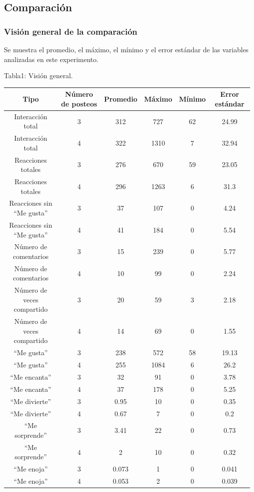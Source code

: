 \documentclass[a4paper,10pt]{article}
\begin{document}
\subsection{Comparación}
\subsubsection{Visión general de la comparación}
Se muestra el promedio, el máximo, el mínimo y el error estándar de las 
variables analizadas en este experimento.
\begin{center}
 \caption{Tabla1: Visión general.}
 {\footnotesize
  \begin{tabular} {c|c|c|c|c|c}
   \hline
   Tipo & Número de posteos & Promedio & Máximo & Mínimo & Error estándar \\
   \hline
   Interacción total  & 3  & 312 & 727  & 62 & 24.99 \\
   Interacción total  & 4  & 322 & 1310 & 7  & 32.94 \\
   Reacciones totales & 3  & 276 & 670  & 59 & 23.05 \\
   Reacciones totales & 4  & 296 & 1263 & 6  & 31.3 \\
   Reacciones sin ``Me gusta'' & 3  & 37 & 107 & 0 & 4.24 \\
   Reacciones sin ``Me gusta'' & 4  & 41 & 184 & 0 & 5.54 \\
   Número de comentarios & 3  & 15 & 239 & 0 & 5.77 \\
   Número de comentarios & 4  & 10 & 99  & 0 & 2.24 \\
   Número de veces compartido & 3  & 20 & 59 & 3 & 2.18 \\
   Número de veces compartido & 4  & 14 & 69 & 0 & 1.55 \\
   ``Me gusta'' & 3  & 238 & 572 & 58 & 19.13 \\
   ``Me gusta'' & 4  & 255 & 1084 & 6 & 26.2 \\
   ``Me encanta'' & 3  & 32 & 91 & 0 & 3.78 \\
   ``Me encanta'' & 4  & 37 & 178 & 0 & 5.25 \\
   ``Me divierte'' & 3  & 0.95 & 10 & 0 & 0.35 \\
   ``Me divierte'' & 4  & 0.67 & 7 & 0 & 0.2 \\
   ``Me sorprende'' & 3  & 3.41 & 22 & 0 & 0.73 \\
   ``Me sorprende'' & 4  & 2 & 10 & 0 & 0.32 \\
   ``Me enoja'' & 3  & 0.073 & 1 & 0 & 0.041 \\
   ``Me enoja'' & 4  & 0.053 & 2 & 0 & 0.039 \\

\end{tabular}}
\end{center}
\end{document}

